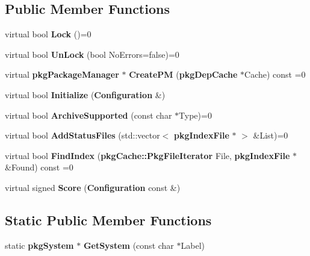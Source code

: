 \subsection*{\-Public \-Member \-Functions}
\begin{DoxyCompactItemize}
\item 
virtual bool {\bfseries \-Lock} ()=0\label{classpkgSystem_a1d3709369d7c357964a48a05c1f3dcf3}

\item 
virtual bool {\bfseries \-Un\-Lock} (bool \-No\-Errors=false)=0\label{classpkgSystem_a610beeab96963e5e302f326a4dae5a73}

\item 
virtual {\bf pkg\-Package\-Manager} $\ast$ {\bfseries \-Create\-P\-M} ({\bf pkg\-Dep\-Cache} $\ast$\-Cache) const =0\label{classpkgSystem_a0ef2a3583d74dd973e68fa9099ca4ff2}

\item 
virtual bool {\bfseries \-Initialize} ({\bf \-Configuration} \&)\label{classpkgSystem_ac354b4434a312f8ef66798255052a9bf}

\item 
virtual bool {\bfseries \-Archive\-Supported} (const char $\ast$\-Type)=0\label{classpkgSystem_ab76b287a260a4c596f5bd95b91b54556}

\item 
virtual bool {\bfseries \-Add\-Status\-Files} (std\-::vector$<$ {\bf pkg\-Index\-File} $\ast$ $>$ \&\-List)=0\label{classpkgSystem_a351ca496c37c276759eff746c79020de}

\item 
virtual bool {\bfseries \-Find\-Index} ({\bf pkg\-Cache\-::\-Pkg\-File\-Iterator} \-File, {\bf pkg\-Index\-File} $\ast$\&\-Found) const =0\label{classpkgSystem_a620a6f4cfdcc499a565882a928d73adc}

\item 
virtual signed {\bfseries \-Score} ({\bf \-Configuration} const \&)\label{classpkgSystem_af28ca6f635afb5e4d34fc354cc3a8594}

\end{DoxyCompactItemize}
\subsection*{\-Static \-Public \-Member \-Functions}
\begin{DoxyCompactItemize}
\item 
static {\bf pkg\-System} $\ast$ {\bfseries \-Get\-System} (const char $\ast$\-Label)\label{classpkgSystem_affdd450f38b92e772cf691a1bc02262d}

\end{DoxyCompactItemize}
